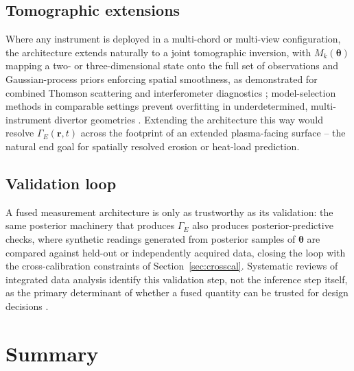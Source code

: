 \subsection{Tomographic extensions}

Where any instrument is deployed in a multi-chord or multi-view configuration, the architecture extends naturally to a joint tomographic inversion, with $M_{k}(\boldsymbol{\theta})$ mapping a two- or three-dimensional state onto the full set of observations and Gaussian-process priors enforcing spatial smoothness, as demonstrated for combined Thomson scattering and interferometer diagnostics \cite{ref0683}; model-selection methods in comparable settings prevent overfitting in underdetermined, multi-instrument divertor geometries \cite{ref0685}. Extending the architecture this way would resolve $\Gamma_{E}(\mathbf{r}, t)$ across the footprint of an extended plasma-facing surface -- the natural end goal for spatially resolved erosion or heat-load prediction.

\subsection{Validation loop}

A fused measurement architecture is only as trustworthy as its validation: the same posterior machinery that produces $\Gamma_{E}$ also produces posterior-predictive checks, where synthetic readings generated from posterior samples of $\boldsymbol{\theta}$ are compared against held-out or independently acquired data, closing the loop with the cross-calibration constraints of Section~\ref{sec:crosscal}. Systematic reviews of integrated data analysis identify this validation step, not the inference step itself, as the primary determinant of whether a fused quantity can be trusted for design decisions \cite{ref0712}.

\section{Summary}
\label{sec:fusion_summary}

